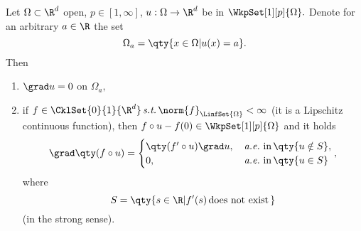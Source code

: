 \begin{theorem}
	Let $\Omega \subset \R^{d}$ open, $p \in [1, \infty]$, $u: \Omega \to \R^{d}$ be in $\WkpSet[1][p]{\Omega}.$ Denote for an arbitrary $a \in \R$ the set
	\[
		\Omega_a = \qty{x \in \Omega | u(x) = a}.
	\]
	Then 
	\begin{enumerate}
		\item $\grad u = 0$ on $\Omega_a,$ 
		\item if $f \in \CklSet{0}{1}{\R^{d}} \, \text{\textit{s.t.}} \, \norm{f}_{\LinfSet{\Omega}} < \infty$ (it is a Lipschitz continuous function), then $f \circ u - f(0) \in \WkpSet[1][p]{\Omega}$ and it holds
			\[
				\grad \qty(f \circ u) = \begin{cases}
					\qty(f' \circ u)\grad u, & \, \text{\textit{a.e.}} \,\, \text{in} \, \qty{u \notin S},\\
					0, & \, \text{\textit{a.e.}} \, \, \text{in} \, \qty{u \in S}
				\end{cases},
			\]
			where 
			\[
				S = \qty{s \in \R| f'(s) \, \text{does not exist} \,}
			\]
			(in the strong sense).
	\end{enumerate}
\end{theorem}

